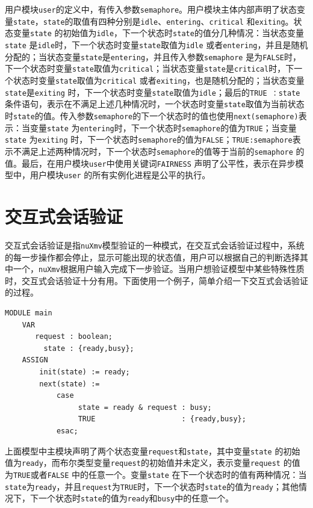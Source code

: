 用户模块\verb|user|的定义中，有传入参数\verb|semaphore|。用户模块主体内部声明了状态变量\verb|state|，\verb|state|的取值有四种分别是\verb|idle|、\verb|entering|、\verb|critical| 和\verb|exiting|。状态变量\verb|state| 的初始值为\verb|idle|，下一个状态时\verb|state|的值分几种情况：当状态变量\verb|state| 是\verb|idle|时，下一个状态时变量\verb|state|取值为\verb|idle| 或者\verb|entering|，并且是随机分配的；当状态变量\verb|state|是\verb|entering|，并且传入参数\verb|semaphore| 是为\verb|FALSE|时，下一个状态时变量\verb|state|取值为\verb|critical|；当状态变量\verb|state|是\verb|critical|时，下一个状态时变量\verb|state|取值为\verb|critical| 或者\verb|exiting|，也是随机分配的；当状态变量\verb|state|是\verb|exiting| 时，下一个状态时变量\verb|state|取值为\verb|idle|；最后的\verb|TRUE ：state| 条件语句，表示在不满足上述几种情况时，一个状态时变量\verb|state|取值为当前状态时\verb|state|的值。传入参数\verb|semaphore|的下一个状态时的值也使用\verb|next(semaphore)|表示：当变量\verb|state| 为\verb|entering|时，下一个状态时\verb|semaphore|的值为\verb|TRUE|；当变量\verb|state| 为\verb|exiting| 时，下一个状态时\verb|semaphore|的值为\verb|FALSE|；\verb|TRUE:semaphore|表示不满足上述两种情况时，下一个状态时\verb|semaphore|的值等于当前的\verb|semaphore| 的值。最后，在用户模块\verb|user|中使用关键词\verb|FAIRNESS| 声明了公平性，表示在异步模型中，用户模块\verb|user| 的所有实例化进程是公平的执行。

\section{交互式会话验证}
交互式会话验证是指\verb|nuXmv|模型验证的一种模式，在交互式会话验证过程中，系统的每一步操作都会停止，显示可能出现的状态值，用户可以根据自己的判断选择其中一个，\verb|nuXmv|根据用户输入完成下一步验证。当用户想验证模型中某些特殊性质时，交互式会话验证十分有用。下面使用一个例子，简单介绍一下交互式会话验证的过程。

\begin{lstlisting}
MODULE main
    VAR
       request : boolean;
         state : {ready,busy};
    ASSIGN
    	init(state) := ready;
    	next(state) :=
            case
                 state = ready & request : busy;
                 TRUE                    : {ready,busy};
            esac;
\end{lstlisting}


上面模型中主模块声明了两个状态变量\verb|request|和\verb|state|，其中变量\verb|state| 的初始值为\verb|ready|，而布尔类型变量\verb|request|的初始值并未定义，表示变量\verb|request| 的值为\verb|TRUE|或者\verb|FALSE| 中的任意一个。变量\verb|state| 在下一个状态时的值有两种情况：当\verb|state|为\verb|ready|，并且\verb|request|为\verb|TRUE|时，下一个状态时\verb|state|的值为\verb|ready|；其他情况下，下一个状态时\verb|state|的值为\verb|ready|和\verb|busy|中的任意一个。

